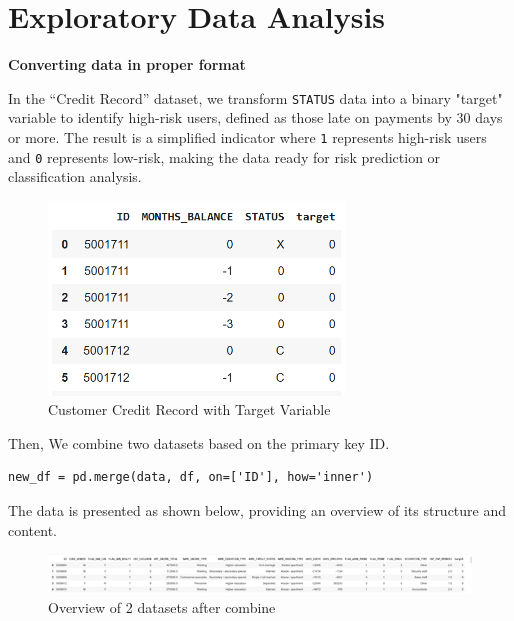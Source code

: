 \documentclass[12pt]{report}
\begin{document}
    \section{Exploratory Data Analysis}
    {\bfseries Converting data in proper format}

    In the “Credit Record” dataset, we transform \texttt{STATUS} data into a binary "target" variable to identify high-risk users, defined as those late on payments by 30 days or more. The result is a simplified indicator where \texttt{1} represents high-risk users and \texttt{0} represents low-risk, making the data ready for risk prediction or classification analysis.

    \begin{figure}[h!]
        \centering
        \includegraphics[width=0.7\textwidth]{resources/pic/Customer Credit Record with Target Variable.png}
        \caption{Customer Credit Record with Target Variable}
        \label{Customer Credit Record with Target Variable}
    \end{figure}

    Then, We combine two datasets based on the primary key ID.

    \begin{lstlisting}[style=default, language=python*, gobble=3]
        new_df = pd.merge(data, df, on=['ID'], how='inner')
    \end{lstlisting}

    The data is presented as shown below, providing an overview of its structure and content.

    \begin{figure}[h!]
        \centering
        \includegraphics[width=\textwidth]{resources/pic/Overview of 2 datasets after combine.png}
        \caption{Overview of 2 datasets after combine}
        \label{Overview of 2 datasets after combine}
    \end{figure}
\end{document}
